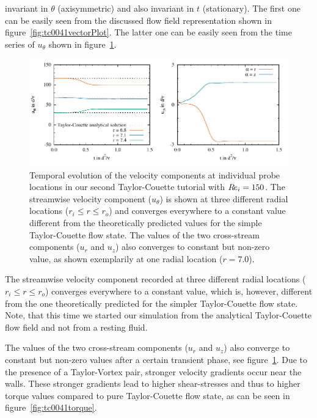 \documentclass[a4paper, 11pt, DIV=11]{scrartcl}
\begin{document}
invariant in $\theta$ (axisymmetric) and also invariant in $t$ (stationary). The
first one can be easily seen from the discussed flow field representation shown
in figure~\ref{fig:tc0041vectorPlot}. The latter one can be easily seen from the
time series of $u_{\theta}$ shown in figure~\ref{fig:tc0041probes}.
\begin{figure}[htb]
\centering
\includegraphics[scale=1.00]{figures/tc0041/probes}
\caption{Temporal evolution of the velocity components at individual probe
locations in our second Taylor-Couette tutorial  with $R\hspace{-0.1em}e_{i}=\num{150}$.
The streamwise velocity component ($u_{\theta}$) is shown
at three different radial locations ($r_{i}\le r\le r_{o}$) and converges
everywhere to a constant value different from the theoretically predicted values for
the simple Taylor-Couette flow state. The values of the two cross-stream components
($u_r$ and $u_z$) also converges to constant but non-zero value, as shown exemplarily
at one radial location ($r=\num{7.0}$).}
\label{fig:tc0041probes}
\end{figure}
The streamwise velocity component recorded at three different radial
locations ($r_{i}\le r\le r_{o}$) converges everywhere to a constant
value, which is, however, different from the one theoretically predicted
for the simpler Taylor-Couette flow state. Note, that this time we
started our simulation from the analytical Taylor-Couette flow field
and not from a resting fluid.
\par
The values of the two cross-stream components ($u_r$ and $u_z$) also converge to constant
but non-zero values after a certain transient phase, see figure~\ref{fig:tc0041probes}. Due
to the presence of a Taylor-Vortex pair, stronger velocity gradients occur near the walls.
These stronger gradients lead to higher shear-stresses and thus to higher torque values
compared to pure Taylor-Couette flow state, as can be seen in figure~\ref{fig:tc0041torque}.
\end{document}
